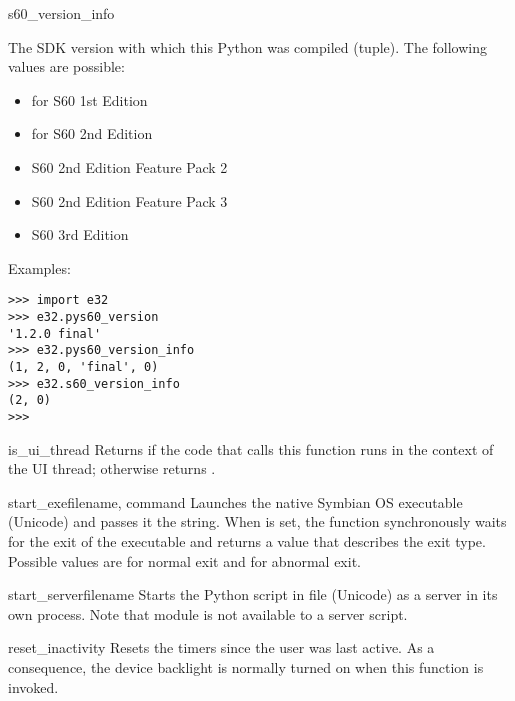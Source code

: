 \begin{datadesc}{s60_version_info}

The SDK version with which this Python was compiled (tuple). The following 
values are possible:

\begin{itemize}
\item {} for S60 1st Edition
\item {} for S60 2nd Edition
\item {} S60 2nd Edition Feature Pack 2
\item {} S60 2nd Edition Feature Pack 3
\item {} S60 3rd Edition
\end{itemize}

Examples:
\begin{verbatim}
>>> import e32
>>> e32.pys60_version
'1.2.0 final'
>>> e32.pys60_version_info
(1, 2, 0, 'final', 0)
>>> e32.s60_version_info
(2, 0)
>>>
\end{verbatim}
\end{datadesc}

\begin{funcdesc}{is_ui_thread}{}
Returns  if the code that calls this function runs in the 
context of the UI thread; otherwise returns .
\end{funcdesc}

\begin{funcdesc}{start_exe}{filename, command }
Launches the native Symbian OS executable  
(Unicode) and passes it the  string. When 
 is set, the function synchronously waits for the exit 
of the executable and returns a value that describes the exit type. Possible 
values are  for normal exit and  for abnormal exit.
\end{funcdesc}

\begin{funcdesc}{start_server}{filename}
Starts the Python script in file  (Unicode) as a 
server in its own process. Note that  module is not 
available to a server script.
\end{funcdesc}

\begin{funcdesc}{reset_inactivity}{}
Resets the timers since the user was last active. As a consequence, the device 
backlight is normally turned on when this function is invoked.
\end{funcdesc}

